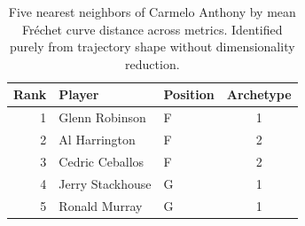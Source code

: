 \begin{table}[htbp]
  \centering\small
  \begin{tabular}{rllc}
    \toprule
    Rank & Player & Position & Archetype \\
    \midrule
    1 & Glenn Robinson & F & 1 \\
    2 & Al Harrington & F & 2 \\
    3 & Cedric Ceballos & F & 2 \\
    4 & Jerry Stackhouse & G & 1 \\
    5 & Ronald Murray & G & 1 \\
    \bottomrule
  \end{tabular}
  \caption{Five nearest neighbors of Carmelo Anthony by mean Fr\'{e}chet curve distance across metrics. Identified purely from trajectory shape without dimensionality reduction.}
  \label{tab:Carmelo_Anthony_frechet_curve_neighbors}
\end{table}

